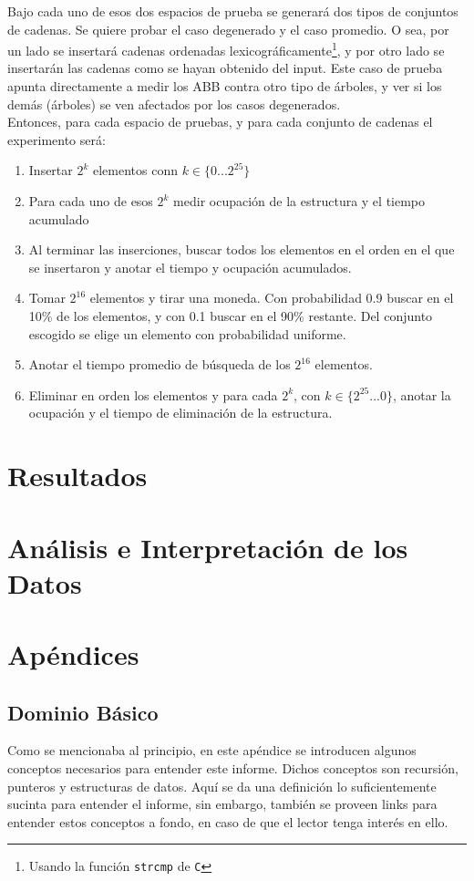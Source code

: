 \documentclass[12pt,letterpaper]{report}
\begin{document}
Bajo cada uno de esos dos espacios de prueba se generará dos tipos de conjuntos de cadenas. Se quiere probar el caso degenerado y el caso promedio. O sea, por un lado se insertará cadenas ordenadas lexicográficamente\footnote{Usando la función \texttt{strcmp} de \texttt{C}}, y por otro lado se insertarán las cadenas como se hayan obtenido del input. Este caso de prueba apunta directamente a medir los ABB contra otro tipo de árboles, y ver si los demás (árboles) se ven afectados por los casos degenerados.\\

Entonces, para cada espacio de pruebas, y para cada conjunto de cadenas el experimento será:

\begin{enumerate}
\item Insertar $2^k$ elementos conn $k\in \{0 ... 2^{25}\}$
\item Para cada uno de esos $2^k$ medir ocupación de la estructura y el tiempo acumulado
\item Al terminar las inserciones, buscar todos los elementos en el orden en el que se insertaron y anotar el tiempo y ocupación acumulados.
\item Tomar $2^{16}$ elementos y tirar una moneda. Con probabilidad 0.9 buscar en el 10\% de los elementos, y con 0.1 buscar en el 90\% restante. Del conjunto escogido se elige un elemento con probabilidad uniforme.
\item Anotar el tiempo promedio de búsqueda de los $2^{16}$ elementos.
\item Eliminar en orden los elementos y para cada $2^k$, con $k\in \{2^{25} ... 0\}$, anotar la ocupación y el tiempo de eliminación de la estructura.
\end{enumerate}


\section{Resultados}
\section{Análisis e Interpretación de los Datos}
\section{Apéndices}
\subsection{Dominio Básico}
\label{subsec:apen_dombasico}
Como se mencionaba al principio, en este apéndice se introducen algunos conceptos necesarios para entender este informe. Dichos conceptos son recursión, punteros y estructuras de datos. Aquí se da una definición lo suficientemente sucinta para entender el informe, sin embargo, también se proveen links para entender estos conceptos a fondo, en caso de que el lector tenga interés en ello.
\end{document}
